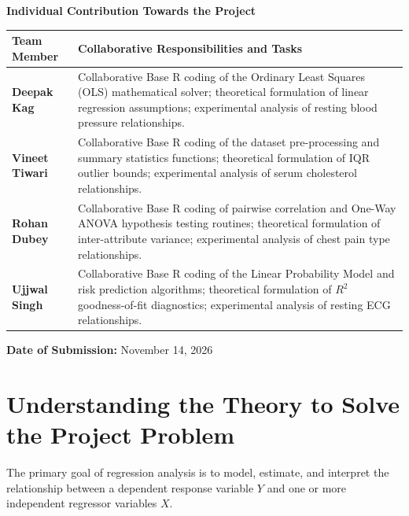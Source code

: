 \documentclass[12pt,a4paper]{article}
\renewcommand{\arraystretch}{1.2}
\begin{document}
\begin{titlepage}
    {\Large \textbf{Individual Contribution Towards the Project}}\\[0.3cm]
    \renewcommand{\arraystretch}{1.3}
    \noindent
    \begin{tabularx}{\textwidth}{|p{3.6cm}|L|}
        \hline
        \textbf{Team Member} & \textbf{Collaborative Responsibilities and Tasks} \\
        \hline
        \textbf{Deepak Kag} & Collaborative Base R coding of the Ordinary Least Squares (OLS) mathematical solver; theoretical formulation of linear regression assumptions; experimental analysis of resting blood pressure relationships. \\
        \hline
        \textbf{Vineet Tiwari} & Collaborative Base R coding of the dataset pre-processing and summary statistics functions; theoretical formulation of $\text{IQR}$ outlier bounds; experimental analysis of serum cholesterol relationships. \\
        \hline
        \textbf{Rohan Dubey} & Collaborative Base R coding of pairwise correlation and One-Way ANOVA hypothesis testing routines; theoretical formulation of inter-attribute variance; experimental analysis of chest pain type relationships. \\
        \hline
        \textbf{Ujjwal Singh} & Collaborative Base R coding of the Linear Probability Model and risk prediction algorithms; theoretical formulation of $R^2$ goodness-of-fit diagnostics; experimental analysis of resting ECG relationships. \\
        \hline
    \end{tabularx}

    \vfill
    {\large \textbf{Date of Submission:} November 14, 2026\par}
\end{titlepage}

\setcounter{page}{1}

\section{Understanding the Theory to Solve the Project Problem}

The primary goal of regression analysis is to model, estimate, and interpret the relationship between a dependent response variable $Y$ and one or more independent regressor variables $X$.
\end{document}
